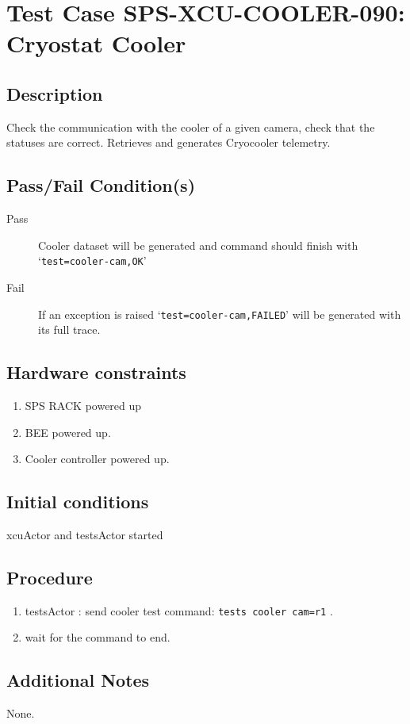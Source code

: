 \section{Test Case SPS-XCU-COOLER-090: Cryostat Cooler}

\subsection{Description}

Check the communication with the cooler of a given camera, check that the statuses are correct.
Retrieves and generates Cryocooler telemetry.

\subsection{Pass/Fail Condition(s)}

\begin{description}
\item [Pass] Cooler dataset will be generated and command should finish with `\texttt{test=cooler-cam,OK}'
\item [Fail] If an exception is raised `\texttt{test=cooler-cam,FAILED}' will be generated with its full trace.

\end{description}

\subsection{Hardware constraints}

\begin{enumerate}
    \item SPS RACK powered up
    \item \acrshort{BEE} powered up.
    \item Cooler controller powered up.
\end{enumerate}

\subsection{Initial conditions}

xcuActor and testsActor started

\subsection{Procedure}

\begin{enumerate}
    \item testsActor : send cooler test command: \texttt{tests cooler cam=r1} .
    \item wait for the command to end.
\end{enumerate}

\subsection{Additional Notes}
None.
